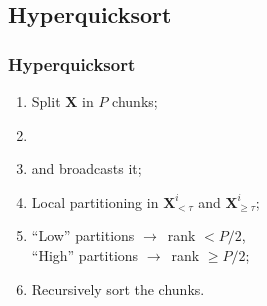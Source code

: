 \documentclass[xcolor=table]{beamer}
\begin{document}


\subsection{Hyperquicksort}
\begin{frame}[fragile]

\frametitle{Hyperquicksort}

\begin{enumerate}
\item Split $\mathbf{X}$ in $P$ chunks;
\item {}
\item {} and broadcasts it;
\item Local partitioning in $\mathbf{X}^{i}_{< \tau}$ and $\mathbf{X}^{i}_{\geq \tau}$;
\item ``Low'' partitions $\rightarrow$~rank $< P/2$,\\
``High'' partitions $\rightarrow$~rank $\geq P/2$;
\item Recursively sort the chunks.
\end{enumerate}

\end{frame}
\end{document}
